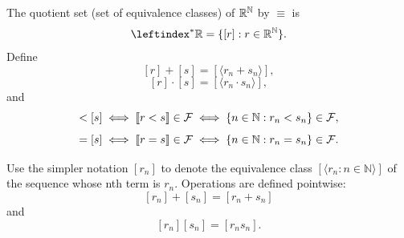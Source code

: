 \noin The quotient set (set of equivalence classes) of $\mathbb{R}^{\mathbb{N}}$ by $\equiv$ is 
$$
\leftindex^* {\R} = \{[r]:r\in \R^\Ns\}.
$$
Define
$$
[r]+[s] = [\langle r_n + s_n\rangle ],
$$
$$
[r]\cdot[s] = [\langle r_n \cdot s_n\rangle],
$$
and
\begin{equation}
    [r]<[s] \iff \ldb r<s \rdb \in \mathcal{F} \iff \{n \in \Ns : r_n < s_n \} \in \mathcal{F},
    \label{eq:2}
\end{equation}
\begin{equation*}
    [r]=[s] \iff \ldb r=s \rdb \in \mathcal{F} \iff \{n \in \Ns : r_n = s_n \} \in \mathcal{F}.
\end{equation*}

Use the simpler notation $[r_n]$ to denote the equivalence class $[\langle r_n : n \in \mathbb{N} \rangle]$ of the sequence whose nth term is $r_n$. Operations are defined pointwise: 
$$
[r_n]+[s_n]=[r_n+s_n]
$$ 
and 
$$
[r_n][s_n]=[r_n s_n].
$$

